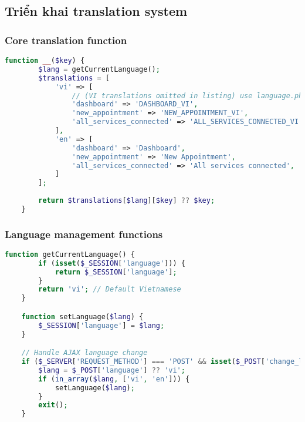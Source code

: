 \documentclass[12pt,a4paper]{report}
\begin{document}
    \subsection{Triển khai translation system}
    \subsubsection{Core translation function}
    \begin{lstlisting}[language=PHP, caption=Core translation function]
    function __($key) {
        $lang = getCurrentLanguage();
        $translations = [
            'vi' => [
                // (VI translations omitted in listing) use language.php in repo
                'dashboard' => 'DASHBOARD_VI',
                'new_appointment' => 'NEW_APPOINTMENT_VI',
                'all_services_connected' => 'ALL_SERVICES_CONNECTED_VI',
            ],
            'en' => [
                'dashboard' => 'Dashboard',
                'new_appointment' => 'New Appointment',
                'all_services_connected' => 'All services connected',
            ]
        ];
        
        return $translations[$lang][$key] ?? $key;
    }
    \end{lstlisting}

    \subsubsection{Language management functions}
    \begin{lstlisting}[language=PHP, caption=Language management]
    function getCurrentLanguage() {
        if (isset($_SESSION['language'])) {
            return $_SESSION['language'];
        }
        return 'vi'; // Default Vietnamese
    }

    function setLanguage($lang) {
        $_SESSION['language'] = $lang;
    }

    // Handle AJAX language change
    if ($_SERVER['REQUEST_METHOD'] === 'POST' && isset($_POST['change_language'])) {
        $lang = $_POST['language'] ?? 'vi';
        if (in_array($lang, ['vi', 'en'])) {
            setLanguage($lang);
        }
        exit();
    }
    \end{lstlisting}
\end{document}
